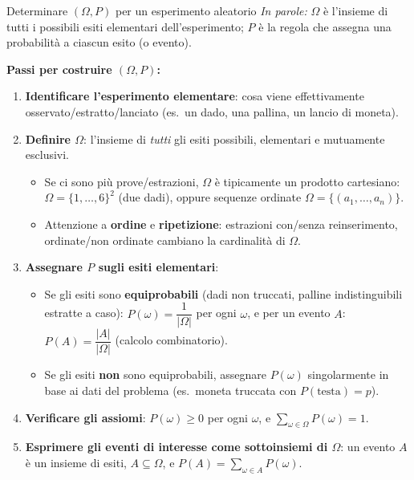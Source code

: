\documentclass[11pt]{article}
\newcommand{\inparole}[1]{\emph{In parole:} #1}
\begin{document}
\begin{concetto}[barBlue]{Determinare $(\Omega, P)$ per un esperimento aleatorio}
\inparole{$\Omega$ \`e l'insieme di tutti i possibili esiti elementari dell'esperimento; $P$ \`e la regola che assegna una probabilit\`a a ciascun esito (o evento).}

\textbf{Passi per costruire $(\Omega, P)$:}
\begin{enumerate}[leftmargin=1.4em,itemsep=2pt,topsep=2pt]
\item \textbf{Identificare l'esperimento elementare}: cosa viene effettivamente osservato/estratto/lanciato (es.\ un dado, una pallina, un lancio di moneta).
\item \textbf{Definire $\Omega$}: l'insieme di \emph{tutti} gli esiti possibili, elementari e mutuamente esclusivi.
\begin{itemize}[leftmargin=1.2em,itemsep=1pt,topsep=1pt]
\item Se ci sono pi\`u prove/estrazioni, $\Omega$ \`e tipicamente un prodotto cartesiano: $\Omega=\{1,\dots,6\}^2$ (due dadi), oppure sequenze ordinate $\Omega=\{(a_1,\dots,a_n)\}$.
\item Attenzione a \textbf{ordine} e \textbf{ripetizione}: estrazioni con/senza reinserimento, ordinate/non ordinate cambiano la cardinalit\`a di $\Omega$.
\end{itemize}
\item \textbf{Assegnare $P$ sugli esiti elementari}:
\begin{itemize}[leftmargin=1.2em,itemsep=1pt,topsep=1pt]
\item Se gli esiti sono \textbf{equiprobabili} (dadi non truccati, palline indistinguibili estratte a caso): $P(\omega) = \dfrac{1}{|\Omega|}$ per ogni $\omega$, e per un evento $A$: $P(A) = \dfrac{|A|}{|\Omega|}$ (calcolo combinatorio).
\item Se gli esiti \textbf{non} sono equiprobabili, assegnare $P(\omega)$ singolarmente in base ai dati del problema (es.\ moneta truccata con $P(\text{testa})=p$).
\end{itemize}
\item \textbf{Verificare gli assiomi}: $P(\omega) \ge 0$ per ogni $\omega$, e $\displaystyle\sum_{\omega \in \Omega} P(\omega) = 1$.
\item \textbf{Esprimere gli eventi di interesse come sottoinsiemi di $\Omega$}: un evento $A$ \`e un insieme di esiti, $A \subseteq \Omega$, e $P(A) = \sum_{\omega \in A} P(\omega)$.
\end{enumerate}
\end{concetto}
\end{document}

